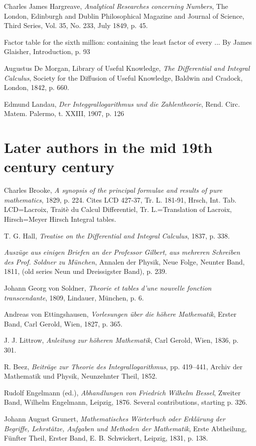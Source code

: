 \documentclass{amsart}
\begin{document}
Charles James Hargreave,
{\em Analytical Researches concerning Numbers},
The London, Edinburgh and Dublin Philosophical Magazine and Journal of Science,
Third Series, Vol. 35, No. 233, July 1849, 
p. 45.

Factor table for the sixth million: containing the least factor of every ... By James Glaisher, Introduction, p. 93

Augustus De Morgan,
Library of Useful Knowledge,
{\em The Differential and Integral Calculus},
Society for the Diffusion of Useful Knowledge, Baldwin and Cradock,
London, 1842, p. 660.

Edmund Landau,
{\em Der Integgrallogarithmus und die Zahlentheorie},
Rend. Circ. Matem. Palermo, t. XXIII, 1907, p. 126

\section{Later authors in the mid 19th century century}
Charles Brooke,
{\em A synopsis of the principal formulae and results of pure mathematics},
1829,
p. 224. Cites LCD 427-37, Tr. L. 181-91, Hrsch, Int. Tab.
LCD=Lacroix, Traitè du Calcul Differentiel,
Tr. L.=Translation of Lacroix,
Hirsch=Meyer Hirsch Integral tables.

T. G. Hall,
{\em Treatise on the Differential and Integral Calculus},
1837, p. 338.

{\em Ausz\"uge aus einigen Briefen an der Professor Gilbert, aus mehreren Schreiben
des Prof. Soldner zu M\"unchen},
Annalen der Physik, Neue Folge, Neunter Band, 1811, (old series
Neun und Dreissigster Band), 
p. 239.

Johann Georg von Soldner,
{\em Theorie et tables d'une nouvelle fonction transcendante},
1809, Lindauer, M\"unchen, p. 6.

Andreas von Ettingshausen, {\em Vorlesungen \"uber die h\"ohere Mathematik},
Erster Band,
Carl Gerold, Wien, 1827, p. 365.

J. J. Littrow,
{\em Anleitung zur h\"oheren Mathematik},
Carl Gerold, Wien, 1836, p. 301.

R. Beez,
{\em Beitr\"age zur Theorie des Integrallogarithmus},
pp. 419--441, Archiv der Mathematik und Physik, Neunzehnter Theil, 1852.

Rudolf Engelmann (ed.),
{\em Abhandlungen von Friedrich Wilhelm Bessel},
Zweiter Band, Wilhelm Engelmann, Leipzig, 1876.
Several contributions, starting p. 326.

Johann August Grunert, {\em Mathematisches W\"orterbuch oder Erkl\"arung der
Begriffe,
Lehrst\"atze, Aufgaben und Methoden der Mathematik}, Erste Abtheilung,
F\"unfter Theil, Erster Band, E. B. Schwickert, Leipzig, 1831, p. 138.
\end{document}
